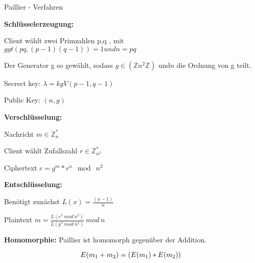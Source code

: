 \documentclass{beamer}
\begin{document}
\begin{frame}{Paillier - Verfahren}

	\textbf{Schlüsselerzeugung:}\\
	
	\begin{arrowlist}
	\item Client wählt zwei Primzahlen p,q , mit $ ggt(pq, (p-1)(q-1))= 1 und n =pq $  
	\item Der Generator g so gewählt, sodass $ g \in (\mathbb{Z} n^{2} \mathbb{Z}) $ und$ n $ die Ordnung von g teilt.	
	\item Secrect key: $ \lambda = kgV(p-1, q-1) $
	\item Public Key: $(n,g)$	
	\end{arrowlist}
	
	

\end{frame}

\begin{frame}
		\textbf{Verschlüsselung:}
		\begin{arrowlist}
			\item Nachricht  $ m \in \mathbb{Z}_{n}^{*} $
			\item Client wählt Zufallszahl $ r  \in \mathbb{Z}_{n^{2}}^{*} $ 
			\item Ciphertext $ c = g^{m}*r^{n} \mod\ n^{2} $
		\end{arrowlist}
		

		\textbf{Entschlüsselung:}
		\begin{arrowlist}
			\item Benötigt zunächst $ L(x)= \frac{(x-1)}{n} $
			\item Plaintext $ m = \frac{L(c^{\lambda} \ mod \ n^{2}) }{L(g^{\lambda} \ mod \ n^{2})} \ mod \ n $
		\end{arrowlist}


		\textbf{Homomorphie:}
		Paillier ist homomorph gegenüber der Addition.
		
		$$ E(m \textsubscript{1} + m \textsubscript{2}) = (E(m \textsubscript{1}) * E(m \textsubscript{2}))$$
\end{frame}
\end{document}
